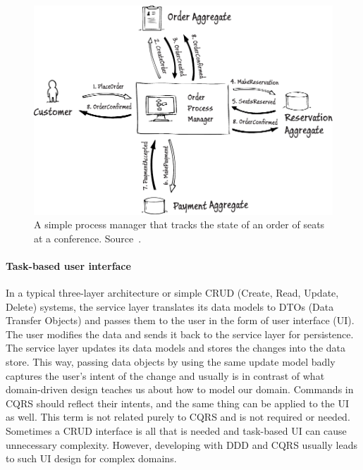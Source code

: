 \documentclass{book}
\begin{document}
\begin{figure}[h!]
\begin{center}
\includegraphics[width=1\columnwidth]{figures/saga/saga}
\caption[A simple process manager]{A simple process manager that tracks the state of an order of seats at a
conference. Source~\cite{journey}.%
}
\end{center}
\end{figure}

\paragraph{Task-based user interface}\label{task-based-user-interface}

In a typical three-layer architecture or simple CRUD (Create, Read,
Update, Delete) systems, the service layer translates its data models to
DTOs (Data Transfer Objects) and passes them to the user in the form of
user interface (UI). The user modifies the data and sends it back to the
service layer for persistence. The service layer updates its data models
and stores the changes into the data store. This way, passing data
objects by using the same update model badly captures the user's intent
of the change and usually is in contrast of what domain-driven design
teaches us about how to model our domain. Commands in CQRS should
reflect their intents, and the same thing can be applied to the UI as
well. This term is not related purely to CQRS and is not required or
needed. Sometimes a CRUD interface is all that is needed and task-based
UI can cause unnecessary complexity. However, developing with DDD and
CQRS usually leads to such UI design for complex domains.
\end{document}
